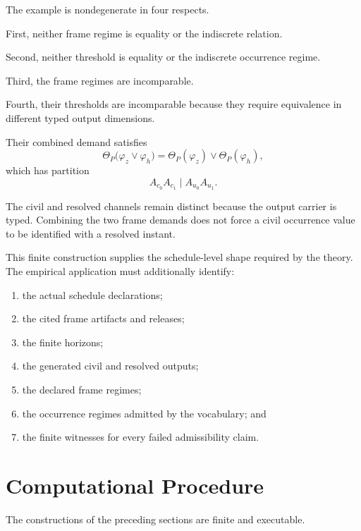 \documentclass[11pt]{article}
\theoremstyle{plain}
\theoremstyle{definition}
\theoremstyle{remark}
\begin{document}
The example is nondegenerate in four respects.

First,
neither frame regime is equality
or the indiscrete relation.

Second,
neither threshold is equality
or the indiscrete occurrence regime.

Third,
the frame regimes are incomparable.

Fourth,
their thresholds are incomparable
because they require equivalence
in different typed output dimensions.

Their combined demand satisfies
\[
  \Theta_P
  \bigl(
  \varphi_z
  \vee
  \varphi_h
  \bigr)
  =
  \Theta_P(\varphi_z)
  \vee
  \Theta_P(\varphi_h),
\]
which has partition
\[
  A_{c_0}A_{c_1}
  \mid
  A_{u_0}A_{u_1}.
\]

The civil and resolved channels remain distinct
because the output carrier is typed.
Combining the two frame demands
does not force a civil occurrence value
to be identified with a resolved instant.

This finite construction supplies
the schedule-level shape required by the theory.
The empirical application must additionally identify:

\begin{enumerate}[label=(\alph*)]
  \item the actual schedule declarations;
  \item the cited frame artifacts and releases;
  \item the finite horizons;
  \item the generated civil and resolved outputs;
  \item the declared frame regimes;
  \item the occurrence regimes admitted by the vocabulary; and
  \item the finite witnesses for every failed admissibility claim.
\end{enumerate}



\section{Computational Procedure}
\label{ik.sec.computational-procedure}

The constructions of the preceding sections are finite and executable.
\end{document}
